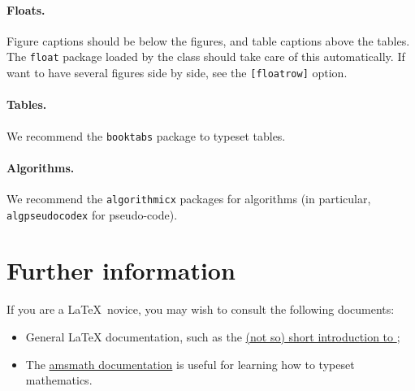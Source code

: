 \documentclass{iacrcc}
\begin{document}
\paragraph{Floats.}
Figure captions should be below the figures, and table captions above
the tables.  The \texttt{float} package loaded by the class should
take care of this automatically.  If want to have several figures side
by side, see the \texttt{[floatrow]} option.

\paragraph{Tables.}
We recommend the \texttt{booktabs} package to typeset tables.

\paragraph{Algorithms.}
We recommend the \texttt{algorithmicx} packages for algorithms (in
particular, \texttt{algpseudocodex} for pseudo-code).

\section{Further information}
If you are a \LaTeX\ novice, you may wish to consult the following documents:
\begin{itemize}
\item General \LaTeX{} documentation, such as the
  \href{http://mirrors.ctan.org/info/lshort/english/lshort.pdf}{(not
    so) short introduction to \LaTeXe};
\item The
  \href{https://mirror.mwt.me/ctan/macros/latex/required/amsmath/amsldoc.pdf}{amsmath
    documentation} is useful for learning how to typeset mathematics.
\end{itemize}

\renewcommand{\refname}{Sample References}

\end{document}
